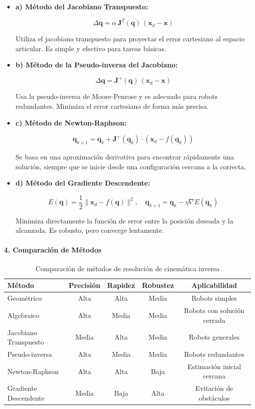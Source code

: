 \begin{itemize}
	\item \textbf{a) Método del Jacobiano Transpuesto:}
	
	\[
	\Delta \mathbf{q} = \alpha \, \mathbf{J}^T(\mathbf{q}) \, (\mathbf{x}_d - \mathbf{x})
	\]
	
	Utiliza el jacobiano transpuesto para proyectar el error cartesiano al espacio articular. Es simple y efectivo para tareas básicas.
	
	\item \textbf{b) Método de la Pseudo-inversa del Jacobiano:}
	
	\[
	\Delta \mathbf{q} = \mathbf{J}^+(\mathbf{q}) \, (\mathbf{x}_d - \mathbf{x})
	\]
	
	Usa la pseudo-inversa de Moore-Penrose y es adecuado para robots redundantes. Minimiza el error cartesiano de forma más precisa.
	
	\item \textbf{c) Método de Newton-Raphson:}
	
	\[
	\mathbf{q}_{k+1} = \mathbf{q}_k + \mathbf{J}^+(\mathbf{q}_k) \cdot (\mathbf{x}_d - f(\mathbf{q}_k))
	\]
	
	Se basa en una aproximación derivativa para encontrar rápidamente una solución, siempre que se inicie desde una configuración cercana a la correcta.
	
	\item \textbf{d) Método del Gradiente Descendente:}
	
	\[
	E(\mathbf{q}) = \frac{1}{2} \| \mathbf{x}_d - f(\mathbf{q}) \|^2, \quad \mathbf{q}_{k+1} = \mathbf{q}_k - \eta \nabla E(\mathbf{q}_k)
	\]
	
	Minimiza directamente la función de error entre la posición deseada y la alcanzada. Es robusto, pero converge lentamente.
\end{itemize}

\paragraph{4. Comparación de Métodos}

\begin{table}[H]
	\centering
	\begin{tabular}{|l|c|c|c|c|}
		\hline
		\textbf{Método} & \textbf{Precisión} & \textbf{Rapidez} & \textbf{Robustez} & \textbf{Aplicabilidad} \\
		\hline
		Geométrico & Alta & Alta & Media & Robots simples \\
		Algebraico & Alta & Media & Media & Robots con solución cerrada \\
		Jacobiano Transpuesto & Media & Alta & Media & Robots generales \\
		Pseudo-inversa & Alta & Media & Media & Robots redundantes \\
		Newton-Raphson & Alta & Alta & Baja & Estimación inicial cercana \\
		Gradiente Descendente & Media & Baja & Alta & Evitación de obstáculos \\
		\hline
	\end{tabular}
	\caption{Comparación de métodos de resolución de cinemática inversa}
\end{table}


